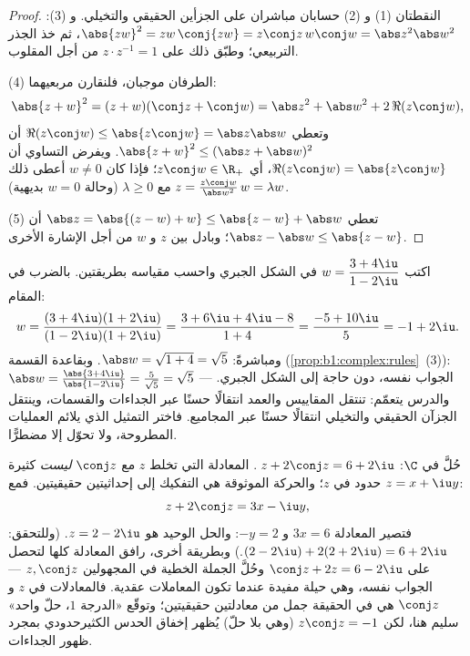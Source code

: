 \begin{proof}
النقطتان (1) و (2) حسابان مباشران على الجزأين الحقيقي والتخيلي.
و (3): $\abs{zw}^2 = zw\,\conj{zw} = z\conj z\, w \conj w = \abs z^2 \abs
w^2$، ثم خذ الجذر التربيعي؛ وطبّق ذلك على $z \cdot z^{-1} = 1$ من أجل
المقلوب.

(4) الطرفان موجبان، فلنقارن مربعيهما:
\[
\abs{z+w}^2 = (z+w)(\conj z + \conj w)
= \abs z^2 + \abs w^2 + 2\,\Re(z \conj w),
\]
وتعطي $\Re(z\conj w) \leq \abs{z \conj w} = \abs z \abs w$ أن
$\abs{z+w}^2 \leq (\abs z + \abs w)^2$. ويفرض التساوي أن $\Re(z \conj
w) = \abs{z \conj w}$، أي $z \conj w \in \R_+$؛ فإذا كان $w \neq 0$ أعطى ذلك
$z = \frac{z\conj w}{\abs w^2}\, w = \lambda w$ مع $\lambda
\geq 0$ (وحالة $w = 0$ بديهية).

(5) تعطي $\abs z = \abs{(z - w) + w} \leq \abs{z-w} + \abs w$ أن $\abs z
- \abs w \leq \abs{z - w}$؛ وبادل بين $z$ و $w$ من أجل الإشارة الأخرى.
\end{proof}

\begin{example}\label{ex:b1:complex:workout}
اكتب $w = \dfrac{3 + 4\iu}{1 - 2\iu}$ في الشكل الجبري واحسب
مقياسه بطريقتين. بالضرب في  المقام:
\[
w = \frac{(3 + 4\iu)(1 + 2\iu)}{(1 - 2\iu)(1 + 2\iu)}
= \frac{3 + 6\iu + 4\iu - 8}{1 + 4}
= \frac{-5 + 10\iu}{5} = -1 + 2\iu .
\]
ومباشرةً: $\abs w = \sqrt{1 + 4} = \sqrt5$. وبقاعدة القسمة
(\cref{prop:b1:complex:rules}~(3)): $\abs w = \frac{\abs{3 +
4\iu}}{\abs{1 - 2\iu}} = \frac5{\sqrt5} = \sqrt5$ --- الجواب نفسه،
دون حاجة إلى الشكل الجبري. والدرس يتعمّم: تنتقل المقاييس
والعمد انتقالًا حسنًا عبر الجداءات والقسمات، وينتقل الجزآن
الحقيقي والتخيلي انتقالًا حسنًا عبر المجاميع. فاختر التمثيل
الذي يلائم العمليات المطروحة، ولا تحوّل إلا مضطرًّا.
\end{example}

\begin{example}\label{ex:b1:complex:conjeq}
حُلَّ في $\C$: $\;z + 2\conj z = 6 + 2\iu$. المعادلة التي تخلط $z$ مع  $\conj z$ \emph{ليست} كثيرة حدود في $z$؛ والحركة
الموثوقة هي التفكيك إلى إحداثيتين حقيقيتين. فمع $z = x + \iu y$:
\[
z + 2\conj z = 3x - \iu y ,
\]
فتصير المعادلة $3x = 6$ و $-y = 2$: والحل الوحيد
هو $z = 2 - 2\iu$. (وللتحقق: $(2 - 2\iu) + 2(2 + 2\iu) = 6 +
2\iu$.) وبطريقة أخرى، رافق المعادلة كلها لتحصل على
$\conj z + 2z = 6 - 2\iu$ وحُلَّ الجملة الخطية في
المجهولين $z, \conj z$ --- الجواب نفسه، وهي حيلة مفيدة عندما
تكون المعاملات عقدية. فالمعادلات في $z$ و $\conj z$ هي في الحقيقة
جمل من معادلتين حقيقيتين؛ وتوقّع «الدرجة $1$، حلّ واحد» سليم
هنا، لكن $z\conj z = -1$ (وهي بلا حلّ) يُظهر إخفاق الحدس
الكثيرحدودي بمجرد ظهور الجداءات.
\end{example}

